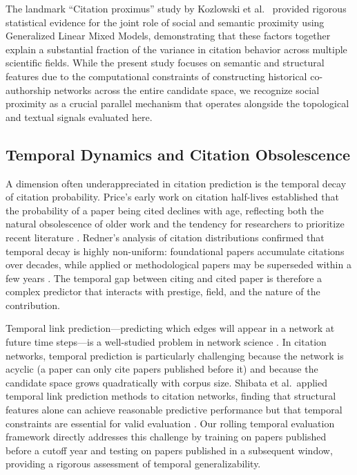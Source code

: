 \documentclass[11pt,a4paper]{article}
\begin{document}
The landmark ``Citation proximus'' study by Kozlowski et al.\ \citep{kozlowski2025citation} provided rigorous statistical evidence for the joint role of social and semantic proximity using Generalized Linear Mixed Models, demonstrating that these factors together explain a substantial fraction of the variance in citation behavior across multiple scientific fields. While the present study focuses on semantic and structural features due to the computational constraints of constructing historical co-authorship networks across the entire candidate space, we recognize social proximity as a crucial parallel mechanism that operates alongside the topological and textual signals evaluated here.

\subsection{Temporal Dynamics and Citation Obsolescence}

A dimension often underappreciated in citation prediction is the temporal decay of citation probability. Price's early work on citation half-lives established that the probability of a paper being cited declines with age, reflecting both the natural obsolescence of older work and the tendency for researchers to prioritize recent literature \citep{de1976general}. Redner's analysis of citation distributions confirmed that temporal decay is highly non-uniform: foundational papers accumulate citations over decades, while applied or methodological papers may be superseded within a few years \citep{redner2005citation}. The temporal gap between citing and cited paper is therefore a complex predictor that interacts with prestige, field, and the nature of the contribution.

Temporal link prediction---predicting which edges will appear in a network at future time steps---is a well-studied problem in network science \citep{liben2007link}. In citation networks, temporal prediction is particularly challenging because the network is acyclic (a paper can only cite papers published before it) and because the candidate space grows quadratically with corpus size. Shibata et al.\ applied temporal link prediction methods to citation networks, finding that structural features alone can achieve reasonable predictive performance but that temporal constraints are essential for valid evaluation \citep{shibata2012link}. Our rolling temporal evaluation framework directly addresses this challenge by training on papers published before a cutoff year and testing on papers published in a subsequent window, providing a rigorous assessment of temporal generalizability.
\end{document}
